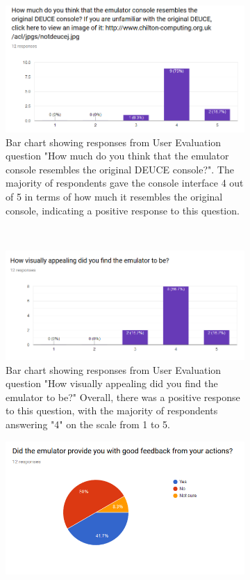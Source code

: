 \documentclass{l4proj}
\begin{document}
\begin{figure}[t]
	\centering
	\begin{subfigure}[t]{0.45\textwidth}
		\includegraphics[width=\textwidth]{images/chart-1}
		\caption{Bar chart showing responses from User Evaluation question "How much do you think that the emulator console resembles the original DEUCE console?". The majority of respondents gave the console interface 4 out of 5 in terms of how much it resembles the original console, indicating a positive response to this question.}
		\label{fig:chart-1}
	\end{subfigure}
	~ %
	\begin{subfigure}[t]{0.45\textwidth}
		\includegraphics[width=\textwidth]{images/chart-2}
		\caption{Bar chart showing responses from User Evaluation question "How visually appealing did you find the emulator to be?" Overall, there was a positive response to this question, with the majority of respondents answering "4" on the scale from 1 to 5.}
		\label{fig:chart-2}
	\end{subfigure}
	\begin{subfigure}[t]{0.45\textwidth}
		\includegraphics[width=\textwidth]{images/chart-3}

\end{subfigure}
\end{figure}
\end{document}

